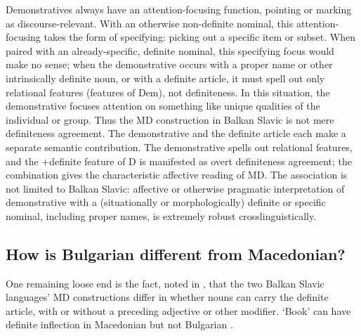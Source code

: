 \documentclass[output=paper,
colorlinks,
citecolor=brown,
newtxmath
]{langscibook}
\begin{document}
\noindent Demonstratives always have an attention-focusing function, pointing or marking as discourse-relevant. With an otherwise non-definite nominal, this attention-focusing takes the form of specifying: picking out a specific item or subset. When paired with an already-specific, definite nominal, this specifying focus would make no sense; when the demonstrative occurs with a proper name or other intrinsically definite noun, or with a definite article, it must spell out only relational features (features of Dem), not definiteness. In this situation, the demonstrative focuses attention on something like unique qualities of the individual or group. Thus the MD construction in Balkan Slavic is not mere definiteness agreement. The demonstrative and the definite article each make a separate semantic contribution. The demonstrative spells out relational features, and the $+$definite feature of D is manifested as overt definiteness agreement; the combination gives the characteristic affective reading of MD. The association is not limited to Balkan Slavic: affective or otherwise pragmatic interpretation of demonstrative with a (situationally or morphologically) definite or specific nominal, including proper names, is extremely robust crosslinguistically.

\subsection{How is Bulgarian different from Macedonian?}
One remaining loose end is the fact, noted in , that the two Balkan Slavic languages' MD constructions differ in whether nouns can carry the definite article, with or without a preceding adjective or other modifier. ‘Book’ can have definite inflection in Macedonian  but not Bulgarian .
\end{document}
